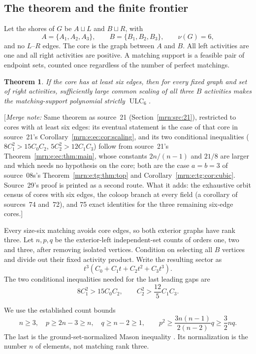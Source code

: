 \documentclass[11pt,a4paper]{article}
\newtheorem{theorem}{Theorem}[section]
\theoremstyle{remark}\newtheorem{remark}[theorem]{Remark}
\newcommand{\ULC}{\operatorname{ULC}}      %
\newcommand{\mnote}[1]{[\textit{Merge note:} #1]}
\begin{document}
\subsection{The theorem and the finite frontier}
Let the shores of $G$ be $A\sqcup L$ and $B\sqcup R$, with
\[
 A=\{A_1,A_2,A_3\},\qquad B=\{B_1,B_2,B_3\},\qquad \nu(G)=6,
\]
and no $L$--$R$ edges. The core is the graph between $A$ and $B$. All left activities are one and all right activities are positive. A matching support is a feasible pair of endpoint sets, counted once regardless of the number of perfect matchings.

\begin{theorem}\label{mrn:e:se:thm:main}
If the core has at least six edges, then for every fixed graph and set of right activities, sufficiently large common scaling of all three $B$ activities makes the matching-support polynomial strictly $\ULC_6$.
\end{theorem}
\mnote{Same theorem as source~21 (Section~\ref{mrn:src:21}), restricted to cores with at least six edges: its eventual statement is the case of that core in source~21's Corollary~\ref{mrn:e:ec:cor:scaling}, and its two conditional inequalities ($8C_1^2>15C_0C_2$, $5C_2^2>12C_1C_3$) follow from source~21's Theorem~\ref{mrn:e:ec:thm:main}, whose constants $2n/(n-1)$ and $21/8$ are larger and which needs no hypothesis on the core; both are the case $a=b=3$ of source~08s's Theorem~\ref{mrn:e:tg:thm:top} and Corollary~\ref{mrn:e:tg:cor:cubic}. Source~29's proof is printed as a second route. What it adds: the exhaustive orbit census of cores with six edges, the coloop branch at every field (a corollary of sources~74 and~72), and 75 exact identities for the three remaining six-edge cores.}

Every size-six matching avoids core edges, so both exterior graphs have rank three. Let $n,p,q$ be the exterior-left independent-set counts of orders one, two and three, after removing isolated vertices. Condition on selecting all $B$ vertices and divide out their fixed activity product. Write the resulting sector as
\[
 t^3(C_0+C_1t+C_2t^2+C_3t^3).
\]
The two conditional inequalities needed for the last leading gaps are
\begin{equation}\label{mrn:e:se:eq:targets}
 8C_1^2>15C_0C_2,\qquad
 C_2^2>\frac{12}{5}C_1C_3.
\end{equation}

We use the established count bounds
\begin{equation}\label{mrn:e:se:eq:counts}
 n\ge3,\quad p\ge2n-3\ge n,\quad q\ge n-2\ge1,\qquad
 p^2\ge\frac{3n(n-1)}{2(n-2)}q\ge\frac32nq.
\end{equation}
The last is the ground-set-normalized Mason inequality \cite[Theorem 4.14]{b:BH}. Its normalization is the number $n$ of elements, not matching rank three.
\end{document}
